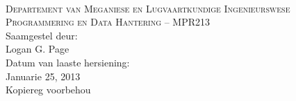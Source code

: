 \begin{titlepage}
    \thispagestyle{empty}
    \begin{center}
        \ \\
        \vspace{2cm}
        {\Large \textsc{Departement van Meganiese en Lugvaartkundige
                        Ingenieurswese}} \\
        \vspace{1.5cm}
        {\huge \textsc{Programmering en Data Hantering -- MPR213}} \\
        \vspace{3cm}
        {\large Saamgestel deur:} \\
        \vspace{0.2cm}
        {\large Logan G. Page} \\
        \vspace{1cm}
        {\large Datum van laaste hersiening:} \\
        \vspace{0.2cm}
        {\large Januarie 25, 2013} \\
        \vspace{1cm}
        {\large Kopiereg voorbehou} \\
    \end{center}
\end{titlepage}
